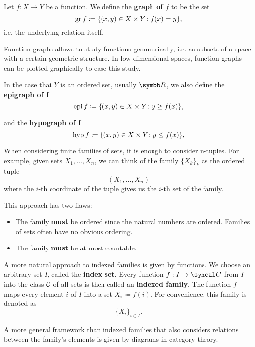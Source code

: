 \begin{definition}\label{def:function_graph}
  Let \( f: X \to Y \) be a function. We define the \textbf{graph of \( f \)} to be the set
  \begin{equation*}
    \operatorname{gr} f \coloneqq \{ (x, y) \in X \times Y \colon f(x) = y \},
  \end{equation*}
  i.e. the underlying relation itself.

  Function graphs allows to study functions geometrically, i.e. as subsets of a space with a certain geometric structure. In low-dimensional spaces, function graphs can be plotted graphically to ease this study.

  In the case that \( Y \) is an ordered set, usually \( \BB{R} \), we also define the \textbf{epigraph of f}
  \begin{equation*}
    \operatorname{epi} f \coloneqq \{ (x, y) \in X \times Y \colon y \geq f(x) \},
  \end{equation*}

  and the \textbf{hypograph of f}
  \begin{equation*}
    \operatorname{hyp} f \coloneqq \{ (x, y) \in X \times Y \colon y \leq f(x) \},
  \end{equation*}
\end{definition}

\begin{definition}\label{def:indexed_family}
  When considering finite families of sets, it is enough to consider n-tuples. For example, given sets \( X_1, \ldots, X_n \), we can think of the family \( \{ X_k \}_k \) as the ordered tuple
  \begin{equation*}
    (X_1, \ldots, X_n)
  \end{equation*}
  where the \( i \)-th coordinate of the tuple gives us the \( i \)-th set of the family.

  This approach has two flaws:
  \begin{itemize}
    \item The family \textbf{must} be ordered since the natural numbers are ordered. Families of sets often have no obvious ordering.
    \item The family \textbf{must} be at most countable.
  \end{itemize}

  A more natural approach to indexed families is given by functions. We choose an arbitrary set \( I \), called the \textbf{index set}. Every function \( f: I \to \Cal C \) from \( I \) into the class \( \cal C \) of all sets is then called an \textbf{indexed family}. The function \( f \) maps every element \( i \) of \( I \) into a set \( X_i \coloneqq f(i) \). For convenience, this family is denoted as
  \begin{equation*}
    \{ X_i \}_{i \in I}.
  \end{equation*}

  A more general framework than indexed families that also considers relations between the family's elements is given by diagrams in category theory.
\end{definition}


